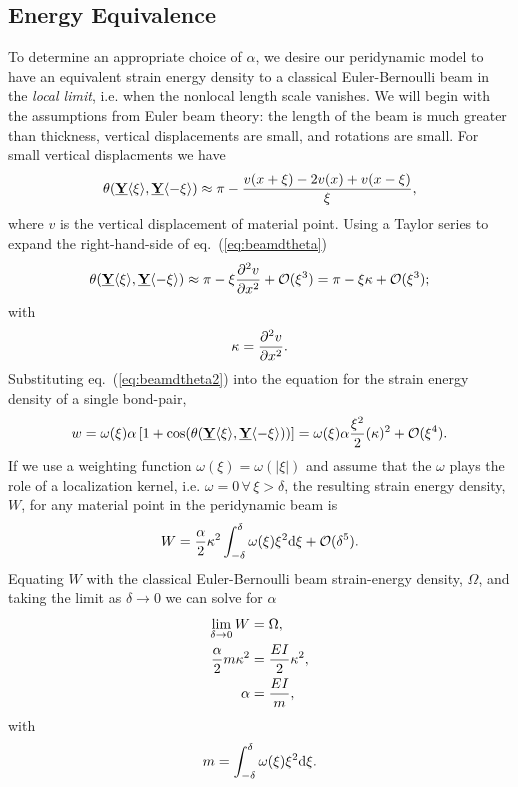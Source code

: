 \documentclass[11pt]{amsart}
\newcommand\vstate[3]{%
	\mathbf{\underline{#1}}%
	\ifstrempty{#2}{}{[#2]}%
	\ifstrempty{#3}{}{\langle #3 \rangle}}
\begin{document}
\subsection{Energy Equivalence}
\label{sec:EnergyEq}
%
To determine an appropriate choice of $\alpha$, we desire our peridynamic model to have an equivalent strain energy density to a classical Euler-Bernoulli beam in the \emph{local limit}, i.e. when the nonlocal length scale vanishes.  We will begin with the assumptions from Euler beam theory: the length of the beam is much greater than thickness, vertical displacements are small, and rotations are small. For small vertical displacments we have
%
\begin{equation}
\theta(\vstate{Y}{}{\xi},\vstate{Y}{}{\mathbf{-\xi}}) \approx \pi-\frac{v(x+\xi)-2v(x)+v(x-\xi)}{\xi},
\label{eq:beamdtheta}
\end{equation}
%
where $v$ is the vertical displacement of material point.  Using a Taylor series to expand the right-hand-side of eq.~(\ref{eq:beamdtheta})  
%
\begin{equation}
\theta(\vstate{Y}{}{\xi},\vstate{Y}{}{\mathbf{-\xi}}) \approx \pi-\xi \frac{\partial^2 v}{\partial x^2}+\mathcal{O}(\xi^3) =  \pi-\xi \kappa +\mathcal{O}(\xi^3); 
\label{eq:beamdtheta2}
\end{equation}
with
\begin{equation}
\kappa = \frac{\partial^2 v}{\partial x^2}.\notag
\end{equation}
%
Substituting eq.~(\ref{eq:beamdtheta2}) into the equation for the strain energy density of a single bond-pair,
%
\begin{align}
\label{eq:continuousBeamw}
w = \omega(\xi) \alpha \left[1+\cos(\theta(\vstate{Y}{}{\xi},\vstate{Y}{}{\mathbf{-\xi}})) \right] = \omega(\xi) \alpha\frac{\xi^2}{2}(\kappa)^2 +\mathcal{O}(\xi^4).\notag
\end{align}
%
If we use a weighting function \(\omega(\xi)=\omega(|\xi|)\) and assume that the $\omega$ plays the role of a localization kernel, i.e. $\omega = 0 \, \forall \, \xi > \delta$, the resulting strain energy density, $W$, for any material point in the peridynamic beam is
%
\begin{equation}
W = \frac{\alpha}{2}\kappa^2 \int_{-\delta}^\delta \omega(\xi)\xi^2 {\rm d}\xi + \mathcal{O}(\delta^5).\notag
\end{equation}
%
Equating $W$ with the classical Euler-Bernoulli beam strain-energy density, $\Omega$, and taking the limit as $\delta \to 0$ we can solve for $\alpha$
%
\begin{align}
    \lim_{\delta \to 0}  W &= \Omega, \notag \\
    \frac{\alpha}{2} m \kappa^2 &= \frac{EI}{2} \kappa^2, \notag \\
    \alpha &= \frac{EI}{m},
\label{eq:alpha}
\end{align}
%
with 
\begin{equation}
    m = \int_{-\delta}^{\delta} \omega(\xi) \xi^2 {\rm d}\xi \notag.
\end{equation}
\end{document}
